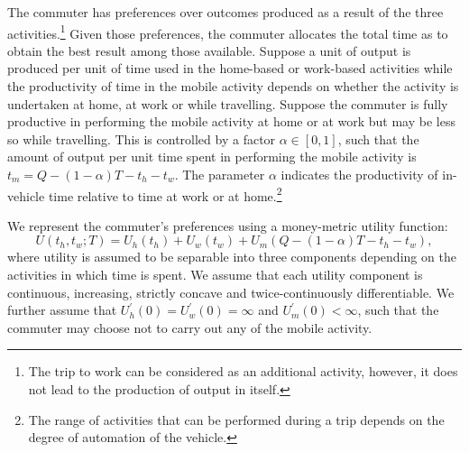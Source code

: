 \documentclass[12pt,a4paper,british]{article}
\begin{document}

The commuter has preferences over outcomes produced as a result of the three activities.\footnote{The trip to work can be considered as an additional activity, however, it does not lead to the production of output in itself.} Given those preferences, the commuter allocates the total time as to obtain the best result among those available. Suppose a unit of output is produced per unit of time used in the home-based or work-based activities while the productivity of time in the mobile activity depends on whether the activity is undertaken at home, at work or while travelling. Suppose the commuter is fully productive in performing the mobile activity at home or at work but may be less so while travelling. This is controlled by a factor $\alpha \in \left[0, 1\right]$, such that the amount of output per unit time spent in performing the mobile activity is $t_{m} = Q - \left( 1 - \alpha \right) T - t_{h}-t_{w}$. The parameter $\alpha$ indicates the productivity of in-vehicle time relative to time at work or at home.\footnote{The range of activities that can be performed during a trip depends on the degree of automation of the vehicle.}






We represent the commuter's preferences using a money-metric utility function:%
\begin{equation}
U\left(t_{h},t_{w};T\right)=U_{h}\left(t_{h}\right)+U_{w}\left(t_{w}\right)+U_{m}\left(Q-\left(1-\alpha\right)T-t_{h}-t_{w}\right),
\label{utility0}
\end{equation}
where utility is assumed to be separable into three components depending on the activities in which time is spent. We assume that each utility component is continuous, increasing, strictly concave and twice-continuously differentiable. We further assume that $U_{h}^{\prime}\left(0\right) = U_{w}^{\prime}\left(0\right) = \infty$ and $U_{m}^{\prime}\left(0\right)<\infty$, such that the commuter may choose not to carry out any of the mobile activity.
\end{document}
